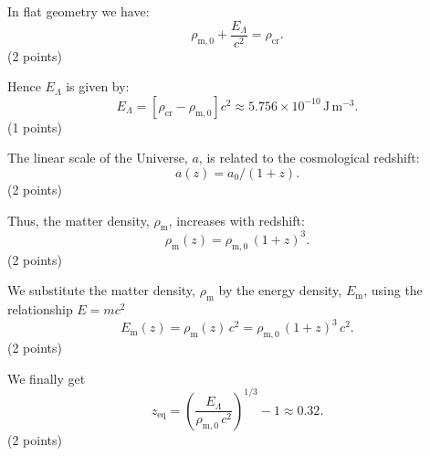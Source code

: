 In flat geometry we have:
\[ \rho_{\mathrm{m},0} + \frac{E_\Lambda}{c^2} = \rho_{\mathrm{cr}}. \]
\hfill(2 points)

Hence $E_\Lambda$ is given by:
\[ E_\Lambda = \left[\rho_{\mathrm{cr}} - \rho_{\mathrm{m},0}\right]c^2
   \approx 5.756\times 10^{-10}\,\mathrm{J\,m^{-3}}. \]
\hfill(1 points)

The linear scale of the Universe, $a$, is related to the cosmological
redshift:
\[ a(z) = a_0/(1 + z). \]
\hfill(2 points)

Thus, the matter density, $\rho_{\mathrm{m}}$, increases with redshift:
\[ \rho_{\mathrm{m}}(z) = \rho_{\mathrm{m},0}\,(1 + z)^3. \]
\hfill(2 points)

We substitute the matter density, $\rho_{\mathrm{m}}$ by the energy
density, $E_{\mathrm{m}}$, using the relationship $E = mc^2$
\[ E_{\mathrm{m}}(z) = \rho_{\mathrm{m}}(z)\,c^2
   = \rho_{\mathrm{m},0}\,(1 + z)^3\,c^2. \]
\hfill(2 points)

We finally get
\[ z_{\mathrm{eq}} = \left(\frac{E_\Lambda}{\rho_{\mathrm{m},0}\,c^2}\right)^{1/3} - 1
   \approx 0.32. \]
\hfill(2 points)

